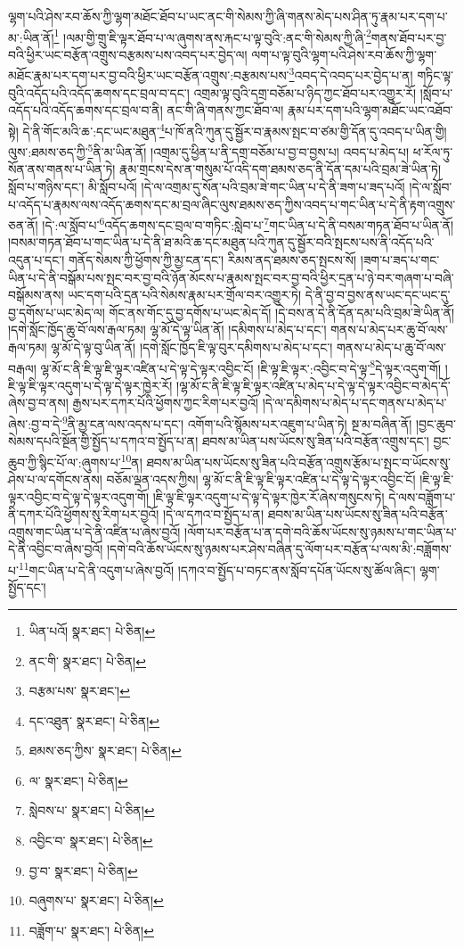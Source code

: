 ལྷག་པའི་ཤེས་རབ་ཆོས་ཀྱི་ལྷག་མཐོང་ཐོབ་པ་ཡང་ནང་གི་སེམས་ཀྱི་ཞི་གནས་མེད་པས་ཤིན་ཏུ་རྣམ་པར་དག་པ་མ་:ཡིན་ནོ།\footnote{ཡིན་པའོ།  སྣར་ཐང་།  པེ་ཅིན། } །ལམ་གྱི་གྲུ་ཇི་ལྟར་ཐོབ་པ་ལ་ཞུགས་ནས་རྐང་པ་ལྟ་བུའི་:ནང་གི་སེམས་ཀྱི་ཞི་\footnote{ནང་གི་  སྣར་ཐང་།  པེ་ཅིན། }གནས་ཐོབ་པར་བྱ་བའི་ཕྱིར་ཡང་བརྩོན་འགྲུས་བརྩམས་པས་འབད་པར་བྱེད་ལ། ལག་པ་ལྟ་བུའི་ལྷག་པའི་ཤེས་རབ་ཆོས་ཀྱི་ལྷག་མཐོང་རྣམ་པར་དག་པར་བྱ་བའི་ཕྱིར་ཡང་བརྩོན་འགྲུས་:བརྩམས་པས་\footnote{བརྩམ་པས་  སྣར་ཐང་། }འབད་དེ་འབད་པར་བྱེད་པ་ན། གཏིང་ལྟ་བུའི་འདོད་པའི་འདོད་ཆགས་དང་བྲལ་བ་དང་། འགྲམ་ལྟ་བུའི་དགྲ་བཅོམ་པ་ཉིད་ཀྱང་ཐོབ་པར་འགྱུར་རོ། །སློབ་པ་འདོད་པའི་འདོད་ཆགས་དང་བྲལ་བ་ནི། ནང་གི་ཞི་གནས་ཀྱང་ཐོབ་ལ། རྣམ་པར་དག་པའི་ལྷག་མཐོང་ཡང་འཐོབ་སྟེ། དེ་ནི་གོང་མའི་ཆ་:དང་ཡང་མཐུན་\footnote{དང་འཐུན་  སྣར་ཐང་།  པེ་ཅིན། }པ་ཁོ་ནའི་ཀུན་དུ་སྦྱོར་བ་རྣམས་སྤང་བ་ཙམ་གྱི་དོན་དུ་འབད་པ་ཡིན་གྱི། ལུས་:ཐམས་ཅད་ཀྱི་\footnote{ཐམས་ཅད་ཀྱིས་  སྣར་ཐང་།  པེ་ཅིན། }ནི་མ་ཡིན་ནོ། །འགྲམ་དུ་ཕྱིན་པ་ནི་དགྲ་བཅོམ་པ་བྱ་བ་བྱས་པ། འབད་པ་མེད་པ། ཕ་རོལ་ཏུ་སོན་ནས་གནས་པ་ཡིན་ཏེ། རྣམ་གྲངས་དེས་ན་གསུམ་པོ་འདི་དག་ཐམས་ཅད་ནི་དོན་དམ་པའི་བྲམ་ཟེ་ཡིན་ཏེ། སློབ་པ་གཉིས་དང་། མི་སློབ་པའོ། །དེ་ལ་འགྲམ་དུ་སོན་པའི་བྲམ་ཟེ་གང་ཡིན་པ་དེ་ནི་ཟག་པ་ཟད་པའོ། །དེ་ལ་སློབ་པ་འདོད་པ་རྣམས་ལས་འདོད་ཆགས་དང་མ་བྲལ་ཞིང་ལུས་ཐམས་ཅད་ཀྱིས་འབད་པ་གང་ཡིན་པ་དེ་ནི་རྟག་འགྲུས་ཅན་ནོ། །དེ་:ལ་སློབ་པ་\footnote{ལ་  སྣར་ཐང་།  པེ་ཅིན། }འདོད་ཆགས་དང་བྲལ་བ་གཏིང་:སླེབ་པ་\footnote{སླེབས་པ་  སྣར་ཐང་།  པེ་ཅིན། }གང་ཡིན་པ་དེ་ནི་བསམ་གཏན་ཐོབ་པ་ཡིན་ནོ། །བསམ་གཏན་ཐོབ་པ་གང་ཡིན་པ་དེ་ནི་ཐ་མའི་ཆ་དང་མཐུན་པའི་ཀུན་དུ་སྦྱོར་བའི་སྤངས་པས་ནི་འདོད་པའི་འདུན་པ་དང་། གནོད་སེམས་ཀྱི་ཕྱོགས་ཀྱི་མྱ་ངན་དང་། རིམས་ནད་ཐམས་ཅད་སྤངས་སོ། །ཟག་པ་ཟད་པ་གང་ཡིན་པ་དེ་ནི་བསྒོམ་པས་སྤང་བར་བྱ་བའི་ཉོན་མོངས་པ་རྣམས་སྤང་བར་བྱ་བའི་ཕྱིར་དྲན་པ་ཉེ་བར་གཞག་པ་བཞི་བསྒོམས་ནས། ཡང་དག་པའི་དྲན་པའི་སེམས་རྣམ་པར་གྲོལ་བར་འགྱུར་ཏེ། དེ་ནི་བྱ་བ་བྱས་ནས་ཡང་དང་ཡང་དུ་བྱ་དགོས་པ་ཡང་མེད་ལ། གོང་ནས་གོང་དུ་བྱ་དགོས་པ་ཡང་མེད་དོ། །དེ་བས་ན་དེ་ནི་དོན་དམ་པའི་བྲམ་ཟེ་ཡིན་ནོ། །དགེ་སློང་ཁྱོད་ཆུ་བོ་ལས་རྒལ་ཏམ། ལྷ་མོ་དེ་ལྟ་ཡིན་ནོ། །དམིགས་པ་མེད་པ་དང་། གནས་པ་མེད་པར་ཆུ་བོ་ལས་རྒལ་ཏམ། ལྷ་མོ་དེ་ལྟ་བུ་ཡིན་ནོ། །དགེ་སློང་ཁྱོད་ཇི་ལྟ་བུར་དམིགས་པ་མེད་པ་དང་། གནས་པ་མེད་པ་ཆུ་བོ་ལས་བརྒལ། ལྷ་མོ་ང་ནི་ཇི་ལྟ་ཇི་ལྟར་འཛིན་པ་དེ་ལྟ་དེ་ལྟར་འབྱིང་ངོ། །ཇི་ལྟ་ཇི་ལྟར་:འབྱིང་བ་དེ་ལྟ་\footnote{འབྱིང་བ་  སྣར་ཐང་།  པེ་ཅིན། }དེ་ལྟར་འདུག་གོ། །ཇི་ལྟ་ཇི་ལྟར་འདུག་པ་དེ་ལྟ་དེ་ལྟར་ཁྱེར་རོ། །ལྷ་མོ་ང་ནི་ཇི་ལྟ་ཇི་ལྟར་འཛིན་པ་མེད་པ་དེ་ལྟ་དེ་ལྟར་འབྱིང་བ་མེད་དོ་ཞེས་བྱ་བ་ནས། རྒྱས་པར་དཀར་པོའི་ཕྱོགས་ཀྱང་རིག་པར་བྱའོ། །དེ་ལ་དམིགས་པ་མེད་པ་དང་གནས་པ་མེད་པ་ཞེས་:བྱ་བ་དེ་\footnote{བྱ་བ་  སྣར་ཐང་།  པེ་ཅིན། }ནི་མྱ་ངན་ལས་འདས་པ་དང་། འགོག་པའི་སྙོམས་པར་འཇུག་པ་ཡིན་ཏེ། སྔ་མ་བཞིན་ནོ། །བྱང་ཆུབ་སེམས་དཔའི་སྔོན་གྱི་སྤྱོད་པ་དཀའ་བ་སྤྱོད་པ་ན། ཐབས་མ་ཡིན་པས་ཡོངས་སུ་ཟིན་པའི་བརྩོན་འགྲུས་དང་། བྱང་ཆུབ་ཀྱི་སྙིང་པོ་ལ་:ཞུགས་པ་\footnote{བཞུགས་པ་  སྣར་ཐང་།  པེ་ཅིན། }ན། ཐབས་མ་ཡིན་པས་ཡོངས་སུ་ཟིན་པའི་བརྩོན་འགྲུས་རྩོམ་པ་སྤང་བ་ཡོངས་སུ་ཤེས་པ་ལ་དགོངས་ནས། བཅོམ་ལྡན་འདས་ཀྱིས། ལྷ་མོ་ང་ནི་ཇི་ལྟ་ཇི་ལྟར་འཛིན་པ་དེ་ལྟ་དེ་ལྟར་འབྱིང་ངོ། །ཇི་ལྟ་ཇི་ལྟར་འབྱིང་བ་དེ་ལྟ་དེ་ལྟར་འདུག་གོ། །ཇི་ལྟ་ཇི་ལྟར་འདུག་པ་དེ་ལྟ་དེ་ལྟར་ཁྱེར་རོ་ཞེས་གསུངས་ཏེ། དེ་ལས་བཟློག་པ་ནི་དཀར་པོའི་ཕྱོགས་སུ་རིག་པར་བྱའོ། །དེ་ལ་དཀའ་བ་སྤྱོད་པ་ན། ཐབས་མ་ཡིན་པས་ཡོངས་སུ་ཟིན་པའི་བརྩོན་འགྲུས་གང་ཡིན་པ་དེ་ནི་འཛིན་པ་ཞེས་བྱའོ། །ལོག་པར་བརྩོན་པ་ན་དགེ་བའི་ཆོས་ཡོངས་སུ་ཉམས་པ་གང་ཡིན་པ་དེ་ནི་འབྱིང་བ་ཞེས་བྱའོ། །དགེ་བའི་ཆོས་ཡོངས་སུ་ཉམས་པར་ཤེས་བཞིན་དུ་ལོག་པར་བརྩོན་པ་ལས་མི་:བཟློགས་པ་\footnote{བཟློག་པ་  སྣར་ཐང་།  པེ་ཅིན། }གང་ཡིན་པ་དེ་ནི་འདུག་པ་ཞེས་བྱའོ། །དཀའ་བ་སྤྱོད་པ་བཏང་ནས་སློབ་དཔོན་ཡོངས་སུ་ཚོལ་ཞིང་། ལྷག་སྤྱོད་དང་། 